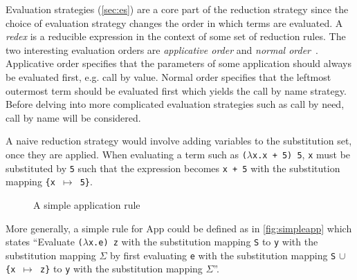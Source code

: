 \documentclass[11pt,oneside,a4paper]{report}
\begin{document}
Evaluation strategies (\autoref{sec:es}) are a core part of the reduction strategy since the choice of evaluation strategy changes the order in which terms are evaluated.
A \textit{redex} is a reducible expression in the context of some set of reduction rules.
The two interesting evaluation orders are \textit{applicative order} and \textit{normal order}~\cite{sestoft2002demonstrating}.
Applicative order specifies that the parameters of some application should always be evaluated first, e.g. call by value.
Normal order specifies that the leftmost outermost term should be evaluated first which yields the call by name strategy.
Before delving into more complicated evaluation strategies such as call by need, call by name will be considered.

A naive reduction strategy would involve adding variables to the substitution set, once they are applied.
When evaluating a term such as \texttt{($\lambda$x.x + 5) 5}, \texttt{x} must be substituted by \texttt{5} such that the expression becomes \texttt{x + 5} with the substitution mapping \texttt{\{x $\mapsto$ 5\}}.
\begin{figure}[ht]
    \begin{mdframed}[style=style1]
        \vspace*{0.4cm}
          \begin{prooftree}
          \end{prooftree}   
    \end{mdframed}
    \caption{A simple application rule}
    \label{fig:simpleapp}
\end{figure}
More generally, a simple rule for App could be defined as in \autoref{fig:simpleapp} which states ``Evaluate \texttt{($\lambda$x.e) z} with the substitution mapping \texttt{S} to \texttt{y} with the substitution mapping $\Sigma$ by first evaluating \texttt{e} with the substitution mapping \texttt{S} $\cup$ \texttt{\{x $\mapsto$ z\}} to \texttt{y} with the substitution mapping $\Sigma$''.
\end{document}
